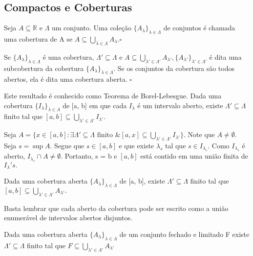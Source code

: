 \documentclass[analysis_notes.tex]{subfiles}
\begin{document}
\subsection{Compactos e Coberturas}
\begin{def*}
	Seja $A\subseteq{\mathbb{R}}$ e $\Lambda $ um conjunto. Uma coleção $\{A_{\lambda }\}_{\lambda \in\Lambda }$ de conjuntos
	é chamada uma cobertura de A se $A\subseteq{\bigcup_{\lambda \in\Lambda }^{}{A_{\lambda }}}.\square$
\end{def*}
\begin{def*}
	Se $\{A_{\lambda }\}_{\lambda \in\Lambda }$ é uma cobertura, $\Lambda '\subseteq{\Lambda }$ e $A\subseteq{\bigcup_{\lambda '\in\Lambda '}^{}{A_{\lambda '}}},
		\{A_{\lambda '}\}_{\lambda '\in\Lambda '}$ é dita uma subcobertura da cobertura $\{A_{\lambda }\}_{\lambda \in\Lambda }.$
	Se os conjuntos da cobertura são todos abertos, ela é dita uma cobertura aberta. $\square$
\end{def*}
\begin{theorem*}
	Este resultado é conhecido como Teorema de Borel-Lebesgue. Dada uma cobertura $\{I_{\lambda }\}_{\lambda \in\Lambda }$ de [a, b]
	em que cada $I_{\lambda }$ é um intervalo aberto, existe $\Lambda '\subseteq{\Lambda }$ finito tal que $[a, b]\subseteq{\bigcup_{\lambda '\in\Lambda '}^{}{I_{\lambda '}.}}$
\end{theorem*}
\begin{proof*}
	Seja $A=\{x\in[a,b]: \exists \Lambda'\subseteq{\Lambda }\text{ finito }\&[a,x]\subseteq{\bigcup_{\lambda '\in\Lambda '}^{}{I_{\lambda '}}}\}$.
	Note que $A \neq\emptyset.$ Seja $s=\sup{A}.$ Segue que $s\in[a, b]$ e que existe $\lambda _{s}$ tal que $s\in I_{\lambda _{s}}.$
	Como $I_{\lambda _{s}}$ é aberto, $I_{\lambda _{s}}\cap A \neq\emptyset$. Portanto, s = b e $[a, b]$ está contido em uma
	união finita de $I_{\lambda }'s.$ \qedsymbol
\end{proof*}
\begin{crl*}
	Dada uma cobertura aberta $\{A_{\lambda }\}_{\lambda \in\Lambda }$ de [a, b], existe $\Lambda '\subseteq{\Lambda }$ finito
	tal que $[a,b]\subseteq{\bigcup_{\lambda '\in\Lambda '}^{}{A_{\lambda'}}}.$
\end{crl*}
Basta lembrar que cada aberto da cobertura pode ser escrito como a união enumerável de intervalos abertos disjuntos.
\begin{crl*}
	Dada uma cobertura aberta $\{A_{\lambda }\}_{\lambda \in\Lambda }$ de um conjunto fechado e limitado F existe $\Lambda '\subseteq{\Lambda }$
	finito tal que $F\subseteq{\bigcup_{\lambda '\in\Lambda '}^{}{A_{\lambda '}}}$
\end{crl*}
\end{document}
